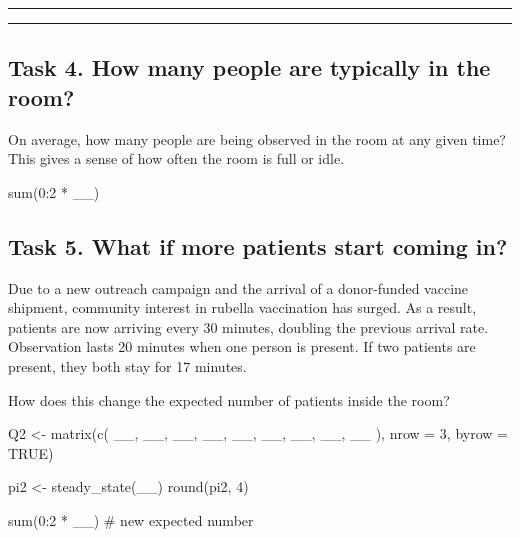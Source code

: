 \documentclass[
]{article}
\newenvironment{Shaded}{\begin{snugshade}}{\end{snugshade}}
\newcommand{\AttributeTok}[1]{\textcolor[rgb]{0.40,0.45,0.13}{#1}}
\newcommand{\CommentTok}[1]{\textcolor[rgb]{0.37,0.37,0.37}{#1}}
\newcommand{\ConstantTok}[1]{\textcolor[rgb]{0.56,0.35,0.01}{#1}}
\newcommand{\DecValTok}[1]{\textcolor[rgb]{0.68,0.00,0.00}{#1}}
\newcommand{\FunctionTok}[1]{\textcolor[rgb]{0.28,0.35,0.67}{#1}}
\newcommand{\NormalTok}[1]{\textcolor[rgb]{0.00,0.23,0.31}{#1}}
\newcommand{\OtherTok}[1]{\textcolor[rgb]{0.00,0.23,0.31}{#1}}
\newcommand{\SpecialCharTok}[1]{\textcolor[rgb]{0.37,0.37,0.37}{#1}}
\begin{document}
\begin{center}\rule{0.5\linewidth}{0.5pt}\end{center}

\begin{center}\rule{0.5\linewidth}{0.5pt}\end{center}

\subsection{Task 4. How many people are typically in the
room?}\label{task-4.-how-many-people-are-typically-in-the-room}

On average, how many people are being observed in the room at any given
time? This gives a sense of how often the room is full or idle.

\begin{Shaded}
\begin{Highlighting}[]
\FunctionTok{sum}\NormalTok{(}\DecValTok{0}\SpecialCharTok{:}\DecValTok{2} \SpecialCharTok{*}\NormalTok{ \_\_)}
\end{Highlighting}
\end{Shaded}

\subsection{Task 5. What if more patients start coming
in?}\label{task-5.-what-if-more-patients-start-coming-in}

Due to a new outreach campaign and the arrival of a donor-funded vaccine
shipment, community interest in rubella vaccination has surged. As a
result, patients are now arriving every 30 minutes, doubling the
previous arrival rate. Observation lasts 20 minutes when one person is
present. If two patients are present, they both stay for 17 minutes.

How does this change the expected number of patients inside the room?

\begin{Shaded}
\begin{Highlighting}[]
\NormalTok{Q2 }\OtherTok{\textless{}{-}} \FunctionTok{matrix}\NormalTok{(}\FunctionTok{c}\NormalTok{(}
\NormalTok{  \_\_, \_\_, \_\_,}
\NormalTok{  \_\_, \_\_, \_\_,}
\NormalTok{  \_\_, \_\_, \_\_}
\NormalTok{), }\AttributeTok{nrow =} \DecValTok{3}\NormalTok{, }\AttributeTok{byrow =} \ConstantTok{TRUE}\NormalTok{)}

\NormalTok{pi2 }\OtherTok{\textless{}{-}} \FunctionTok{steady\_state}\NormalTok{(\_\_)}
\FunctionTok{round}\NormalTok{(pi2, }\DecValTok{4}\NormalTok{)}

\FunctionTok{sum}\NormalTok{(}\DecValTok{0}\SpecialCharTok{:}\DecValTok{2} \SpecialCharTok{*}\NormalTok{ \_\_)  }\CommentTok{\# new expected number}
\end{Highlighting}
\end{Shaded}
\end{document}
